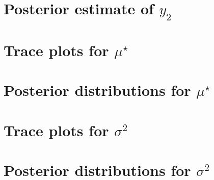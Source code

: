 \documentclass[10pt]{article} %
\begin{document}
\newpage
\section{Posterior estimate of $y_2$}
\begin{figure}[H]
  \begin{center}  %
  \end{center}
  \caption{}
  \label{fig:y2est}
\end{figure}

\newpage
\section{Trace plots for $\mu^\star$}
\begin{figure}[H]
  \begin{center}  %
  \end{center}
  \caption{}
  \label{fig:mus-trace}
\end{figure}

\newpage
\section{Posterior distributions for $\mu^\star$}
\begin{figure}[H]
  \begin{center}  %
  \end{center}
  \caption{}
  \label{fig:mus}
\end{figure}


\newpage
\section{Trace plots for $\sigma^2$}
\begin{figure}[H]
  \begin{center}  %
  \end{center}
  \caption{}
  \label{fig:sig2-trace}
\end{figure}

\newpage
\section{Posterior distributions for $\sigma^2$}
\begin{figure}[H]
  \begin{center}  %
  \end{center}
  \caption{}
  \label{fig:sig2}
\end{figure}
\end{document}
